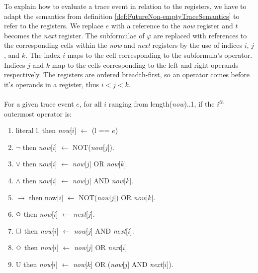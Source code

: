 To explain how to evaluate a trace event in relation to the registers, we have to adapt the semantics from definition \ref{def:FutureNon-emptyTraceSemantics} to refer to the registers.  We replace $e$ with a reference to the \textit{now} register and $t$ becomes the \textit{next} register.  The subformulae of $ \varphi $ are replaced with references to the corresponding cells within the \textit{now} and \textit{next} registers by the use of indices $i$, $j$, and $k$.  The index $i$ maps to the cell corresponding to the subformula's operator.  Indices $j$ and $k$ map to the cells corresponding to the left and right operands respectively.  The registers are ordered breadth-first, so an operator comes before it's operands in a register, thus $i < j < k$.\\
\\
For a given trace event $e$, for all $i$ ranging from length(\textit{now})..1, if the $i^{th}$ outermost operator is:
\begin{enumerate}
\item literal l, then \textit{now}[$i$] $ \leftarrow $ (l == $e$)
\item $ \neg $ then \textit{now}[$i$] $ \leftarrow $ NOT(\textit{now}[$j$]).
\item $ \lor $ then \textit{now}[$i$] $ \leftarrow $ \textit{now}[$j$] OR \textit{now}[$k$]. 
\item $ \land $ then \textit{now}[$i$] $ \leftarrow $ \textit{now}[$j$] AND \textit{now}[$k$]. 
\item $ \rightarrow $ then now[$i$] $ \leftarrow $ NOT(\textit{now}[$j$]) OR \textit{now}[$k$]. 
\item $ \LTLnext $ then \textit{now}[$i$] $ \leftarrow $ \textit{next}[$j$].
\item $ \square $ then \textit{now}[$i$] $ \leftarrow $ \textit{now}[$j$] AND \textit{next}[$i$].
\item $ \Diamond $ then \textit{now}[$i$] $ \leftarrow $ \textit{now}[$j$] OR \textit{next}[$i$].
\item U then \textit{now}[$i$] $ \leftarrow $ \textit{now}[$k$] OR (\textit{now}[$j$] AND \textit{next}[$i$]).
\end{enumerate}

